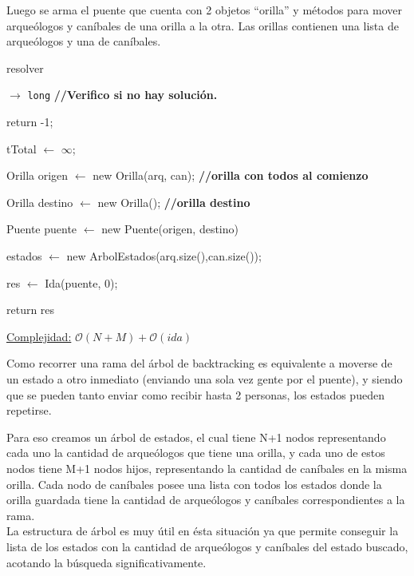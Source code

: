 Luego se arma el puente que cuenta con 2 objetos ``orilla'' y métodos para mover arqueólogos y caníbales de una orilla a la otra. Las orillas contienen una lista de arqueólogos y una de caníbales.

\begin{algorithm}[H]
\caption{resolver}
\begin{algorithmic}[1]
   $\to $ \texttt{long}
    \State \textbf{//Verifico si no hay solución.}
    
		\State	return -1;
	\EndIf
    
	\State	tTotal $\gets$ $\infty$;

	\State	Orilla origen $\gets$ new Orilla(arq, can);	\State \textbf{//orilla con todos al comienzo}
	
	\State	Orilla destino $\gets$ new Orilla();
	\State \textbf{	//orilla destino}

	\State	Puente puente $\gets$ new Puente(origen, destino)
	
	\State	estados $\gets$ new ArbolEstados(arq.size(),can.size());
	
	\State	res $\gets$ Ida(puente, 0);
		
	\State return res
	
 \EndProcedure
\end{algorithmic}
\underline{Complejidad:} $\mathcal{O}(N+M) + \mathcal{O}(ida)$

\vspace*{5mm}
\end{algorithm}

Como recorrer una rama del árbol de backtracking es equivalente a moverse de un estado a otro inmediato (enviando una sola vez gente por el puente), y siendo que se pueden tanto enviar como recibir hasta 2 personas, los estados pueden repetirse. 

Para eso creamos un árbol de estados, el cual tiene N+1 nodos representando cada uno la cantidad de arqueólogos que tiene una orilla, y cada uno de estos nodos tiene M+1 nodos hijos, representando la cantidad de can\'ibales en la misma orilla. 
Cada nodo de can\'ibales posee una lista con todos los estados donde la orilla guardada tiene la cantidad de arqueólogos y caníbales correspondientes a la rama.
\\

La estructura de \'arbol es muy \'util en \'esta situaci\'on ya que permite conseguir la lista de los estados con la cantidad de arque\'ologos y can\'ibales del estado buscado, acotando la b\'usqueda significativamente.

